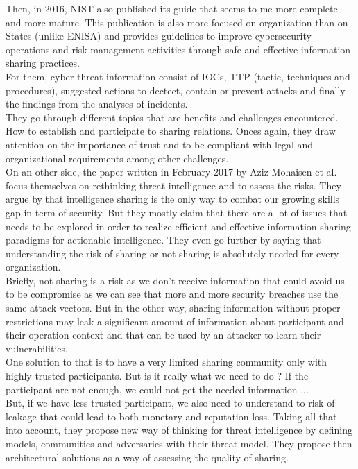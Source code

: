 \documentclass{eplmastersthesis}
\begin{document}
Then, in 2016, NIST also published its guide \cite{johnson2014guide} that seems to me more complete and more mature. This publication is also more focused on organization than on States (unlike ENISA) and provides guidelines to improve cybersecurity operations and risk management activities through safe and effective information sharing practices.\\
For them, cyber threat information consist of IOCs, TTP (tactic, techniques and procedures), suggested actions to dectect, contain or prevent attacks and finally the findings from the analyses of incidents. \\
They go through different topics that are benefits and challenges encountered. How to establish and participate to sharing relations. Onces again, they draw attention on the importance of trust and to be compliant with legal and organizational requirements among other challenges.\\

On an other side, the paper written in February 2017 by Aziz Mohaisen et al. \cite{mohaisen2017rethinking} focus themselves on rethinking threat intelligence and to assess the risks. They argue by \cite{MalikThreat} that intelligence sharing is the only way to combat our growing skills gap in term of security. But they mostly claim that there are a lot of issues that needs to be explored in order to realize efficient and effective information sharing paradigms for actionable intelligence. They even go further by saying that understanding the risk of sharing or not sharing is absolutely needed for every organization.\\
Briefly, not sharing is a risk as we don't receive information that could avoid us to be compromise as we can see that more and more security breaches use the same attack vectors. But in the other way, sharing information without proper restrictions may leak a significant amount of information about participant and their operation context and that can be used by an attacker to learn their vulnerabilities.\\
One solution to that is to have a very limited sharing community only with highly trusted participants. But is it really what we need to do ? If the participant are not enough, we could not get the needed information ...\\
But, if we have less trusted participant, we also need to understand to risk of leakage that could lead to both monetary and reputation loss. Taking all that into account, they propose new way of thinking for threat intelligence by defining models, communities and adversaries with their threat model.
They propose then architectural solutions as a way of assessing the quality of sharing.
\end{document}
